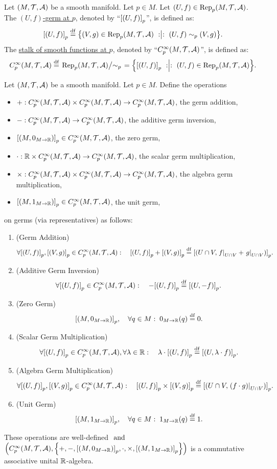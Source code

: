 \documentclass[11pt,reqno]{amsart}
\newcommand{\Rep}{\mathrm{Rep}}
\begin{document}
\begin{Def}
Let $(M,\mathcal{T},\mathcal{A})$ be a smooth manifold. Let $p\in M$.
Let $(U,f)\in\Rep_p(M,\T,\A)$.
The \ul{$(U,f)$-germ at $p$}, denoted by ``$\SqBr{(U,f)}_p$'', is defined as:
\[
\SqBr{(U,f)}_p\df\set{(V,g)\in\Rep_p(M,\T,\A)\st
(U,f)\sim_p(V,g)
}.
\]
The \ul{stalk of smooth functions at $p$}, denoted by
``$C_p^\infty(M,\mathcal{T},\mathcal{A})$'', is defined as:
\[
C_p^\infty(M,\T,\A)\df
\left.\Rep_p(M,\T,\A)\middle/\sim_p\right.
=\set{\SqBr{(U,f)}_p\st(U,f)\in\Rep_p(M,\T,\A)}.
\]
\end{Def}

\begin{Thm}\label{thm:stalk-algebra}
Let $(M,\mathcal{T},\mathcal{A})$ be a smooth manifold. Let $p\in M$.
Define the operations
\begin{itemize}
\item $+:C_p^\infty(M,\mathcal{T},\mathcal{A})\times C_p^\infty(M,\mathcal{T},\mathcal{A})\to C_p^\infty(M,\mathcal{T},\mathcal{A})$,
  the germ addition,
\item $-:C_p^\infty(M,\mathcal{T},\mathcal{A})\to C_p^\infty(M,\mathcal{T},\mathcal{A})$,
  the additive germ inversion,
\item $\SqBr{\Br{M,0_{M\to\R}}}_p\in C_p^\infty(M,\T,\A)$,
  the zero germ,
\item $\cdot:\mathbb{R}\times C_p^\infty(M,\mathcal{T},\mathcal{A})\to C_p^\infty(M,\mathcal{T},\mathcal{A})$,
  the scalar germ multiplication,
\item $\times:C_p^\infty(M,\mathcal{T},\mathcal{A})\times C_p^\infty(M,\mathcal{T},\mathcal{A})\to C_p^\infty(M,\mathcal{T},\mathcal{A})$,
  the algebra germ multiplication,
\item $\SqBr{\Br{M,1_{M\to\R}}}_p\in C_p^\infty(M,\T,\A)$,
  the unit germ,
\end{itemize}
on germs (via representatives) as follows:
\begin{enumerate}
\item (Germ Addition)
  \[\forall \SqBr{(U,f)}_p,\SqBr{(V,g)}_p\in C_p^\infty(M,\T,\A):\quad
  \SqBr{(U,f)}_p+\SqBr{(V,g)}_p\df\SqBr{\Br{U\cap V,\eval{f}_{U\cap V}
+\eval{g}_{U\cap V}}}_p.\]
\item (Additive Germ Inversion)
  \[\forall \SqBr{(U,f)}_p\in C_p^\infty(M,\T,\A):\quad
  -\SqBr{(U,f)}_p\df\SqBr{(U,-f)}_p.\]
\item (Zero Germ)
  \[\SqBr{\Br{M,0_{M\to\R}}}_p,\quad
  \forall q\in M:\;0_{M\to\R}(q)\df0.\]
\item (Scalar Germ Multiplication)
  \[\forall \SqBr{(U,f)}_p\in C_p^\infty(M,\T,\A),\forall\lambda\in\R:\quad
  \lambda\cdot\SqBr{(U,f)}_p\df\SqBr{(U,\lambda\cdot f)}_p.\]
\item (Algebra Germ Multiplication)
  \[\forall \SqBr{(U,f)}_p,\SqBr{(V,g)}_p\in C_p^\infty(M,\T,\A):\quad
  \SqBr{(U,f)}_p\times\SqBr{(V,g)}_p\df\SqBr{\Br{U\cap V,
\eval{(f\cdot g)}_{U\cap V}}}_p.\]
\item (Unit Germ)
  \[\SqBr{\Br{M,1_{M\to\R}}}_p,\quad
  \forall q\in M:\;1_{M\to\R}(q)\df1.\]
\end{enumerate}
These operations are well-defined $~\mathrm{and}~$
$\Br{C_p^\infty(M,\T,\A),\set{+,-,\SqBr{\Br{M,0_{M\to\R}}}_p,\cdot,\times,\SqBr{\Br{M,1_{M\to\R}}}_p}}$
is a commutative associative unital $\mathbb{R}$-algebra.
\end{Thm}
\end{document}
